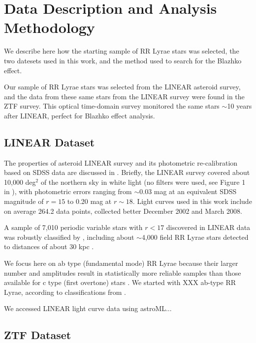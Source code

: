 

\section{Data Description and Analysis Methodology\label{sec:analysis}}

We describe here how the starting sample of RR Lyrae stars was selected, the two datesets used in this work,
and the method used to search for the Blazhko effect.

Our sample of RR Lyrae stars was selected from the LINEAR asteroid survey, and the data from these same stars from the LINEAR survey were found
in the ZTF survey. This optical time-domain survey monitored the same stars $\sim$10 years after LINEAR, perfect for Blazhko effect analysis. 


\subsection{LINEAR Dataset}

The properties of asteroid LINEAR survey and its photometric re-calibration based on SDSS data are discussed in \cite{2011AJ....142..190S}.
Briefly, the LINEAR survey covered about 10,000 deg$^2$ of the northern sky in white light (no filters were used, see Figure 1 in \citealt{2011AJ....142..190S}),
with photometric errors ranging from $\sim$0.03 mag at an equivalent SDSS magnitude of $r=15$ to 0.20 mag at $r\sim18$. Light curves used
in this work include on average 264.2 data points, collected better December 2002 and March 2008.
 
A sample of 7,010 periodic variable stars with $r<17$ discovered in LINEAR data was robustly classified by \cite{2013AJ....146..101P}, including
about $\sim$4,000 field RR Lyrae stars detected to distances of about 30 kpc \citep{2013AJ....146...21S}. 

We focus here on ab type (fundamental mode) RR Lyrae because their larger number and amplitudes result in statistically
more reliable samples than those available for c type (first overtone) stars \cite{2016CoKon.105...61K}.
We started with XXX ab-type RR Lyrae, according to classifications from \cite{2013AJ....146..101P}.

We accessed LINEAR light curve data using astroML...


\subsection{ZTF Dataset}

